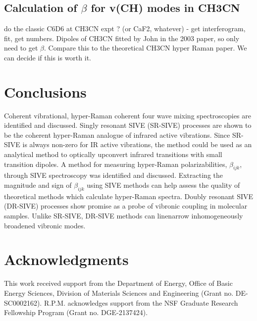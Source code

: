 \documentclass[aip, jcp, reprint, onecolumn]{revtex4-2}
\begin{document}
\subsection{Calculation of $\beta$ for v(CH) modes in CH3CN}
do the classic C6D6 at CH3CN expt ? (or CaF2, whatever) - get interferogram, fit, get numbers.
Dipoles of CH3CN fitted by John in the 2003 paper, so only need to get $\beta$. 
Compare this to the theoretical CH3CN hyper Raman paper.
We can decide if this is worth it. 


\section{Conclusions}%
Coherent vibrational, hyper-Raman coherent four wave mixing spectroscopies are identified and discussed.
Singly resonant SIVE (SR-SIVE) processes are shown to be the coherent hyper-Raman analogue of infrared active vibrations.
Since SR-SIVE is always non-zero for IR active vibrations, the method could be used as an analytical method to optically upconvert infrared transitions with small transition dipoles.
A method for measuring hyper-Raman polarizabilities, $\beta_{ijk}$, through SIVE spectroscopy was identified and discussed.
Extracting the magnitude and sign of $\beta_{ijk}$ using SIVE methods can help assess the quality of theoretical methods which calculate hyper-Raman spectra. 
Doubly resonant SIVE (DR-SIVE) processes show promise as a probe of vibronic coupling in molecular samples.
Unlike SR-SIVE, DR-SIVE methods can linenarrow inhomogeneously broadened vibronic modes. 

\section{Acknowledgments}
This work received support from the Department of Energy, Office of Basic Energy Sciences, Division of Materials Sciences and Engineering (Grant no. DE-SC0002162).
R.P.M. acknowledges support from the NSF Graduate Research Fellowship Program (Grant no. DGE-2137424). 
\end{document}
